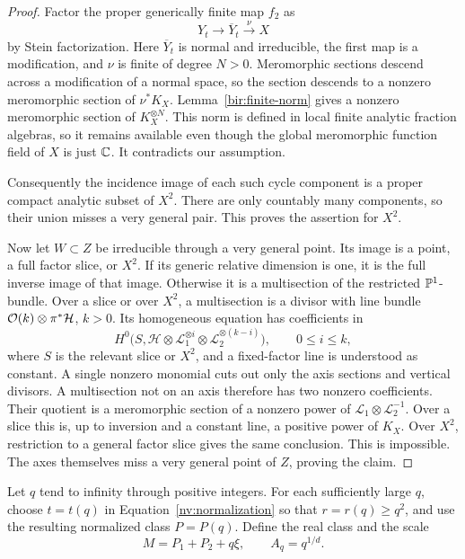 \begin{proof}
Factor the proper generically finite map \(f_2\) as
\[
 Y_t\longrightarrow \overline Y_t
       \xrightarrow{\nu}X
\]
by Stein factorization.  Here \(\overline Y_t\) is normal and irreducible, the first
map is a modification, and \(\nu\) is finite of degree \(N>0\).
Meromorphic sections descend across a modification of a normal
space, so the section descends to a nonzero meromorphic section of
\(\nu^*K_X\).  Lemma~\ref{bir:finite-norm} gives a nonzero meromorphic
section of \(K_X^{\otimes N}\).  This norm is defined in local finite
analytic fraction algebras, so it remains available even though the
global meromorphic function field of \(X\) is just \(\mathbb C\).  It
contradicts our assumption.

Consequently the incidence image of each such cycle component is a
proper compact analytic subset of \(X^2\).  There are only countably
many components, so their union misses a very general pair.  This
proves the assertion for \(X^2\).

Now let \(W\subset Z\) be irreducible through a very general point.
Its image is a point, a full factor slice, or \(X^2\).  If its generic
relative dimension is one, it is the full inverse image of that
image.  Otherwise it is a multisection of the restricted
\(\mathbb P^1\)-bundle.  Over a slice or over \(X^2\), a multisection is a
divisor with line bundle
\(\mathcal O(k)\otimes\pi^*\mathcal{H}\), \(k>0\).  Its homogeneous equation
has coefficients in
\[
 H^0\bigl(S,\mathscr H\otimes
                 \mathscr L_1^{\otimes i}
                 \otimes\mathscr L_2^{\otimes(k-i)}\bigr),
 \qquad 0\le i\le k,
\]
where \(S\) is the relevant slice or \(X^2\), and a fixed-factor line is
understood as constant.  A single nonzero monomial cuts out only the
axis sections and vertical divisors.  A multisection not on an axis
therefore has two nonzero coefficients.  Their quotient is a
meromorphic section of a nonzero power of
\(\mathscr L_1\otimes\mathscr L_2^{-1}\).  Over a slice this is, up to
inversion and a constant line, a positive power of \(K_X\).  Over
\(X^2\), restriction to a general factor slice gives the same
conclusion.  This is impossible.  The axes themselves miss a very
general point of \(Z\), proving the claim.
\end{proof}

Let \(q\) tend to infinity through positive integers.  For each sufficiently
large \(q\), choose \(t=t(q)\) in Equation~\eqref{nv:normalization} so that
\(r=r(q)\ge q^2\), and use the resulting normalized class \(P=P(q)\).
Define the real class and the scale
\begin{equation}\label{nv:M-definition}
 M=P_1+P_2+q\xi,\qquad A_q=q^{1/d}.
\end{equation}

